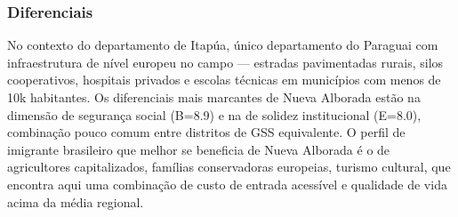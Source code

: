 \subsubsection*{Diferenciais}\label{dif-nueva-alborada-0706}
No contexto do departamento de Itapúa, único departamento do Paraguai com infraestrutura de nível europeu no campo — estradas pavimentadas rurais, silos cooperativos, hospitais privados e escolas técnicas em municípios com menos de 10k habitantes. Os diferenciais mais marcantes de Nueva Alborada estão na dimensão de segurança social (B=8.9) e na de solidez institucional (E=8.0), combinação pouco comum entre distritos de GSS equivalente. O perfil de imigrante brasileiro que melhor se beneficia de Nueva Alborada é o de agricultores capitalizados, famílias conservadoras europeias, turismo cultural, que encontra aqui uma combinação de custo de entrada acessível e qualidade de vida acima da média regional.
